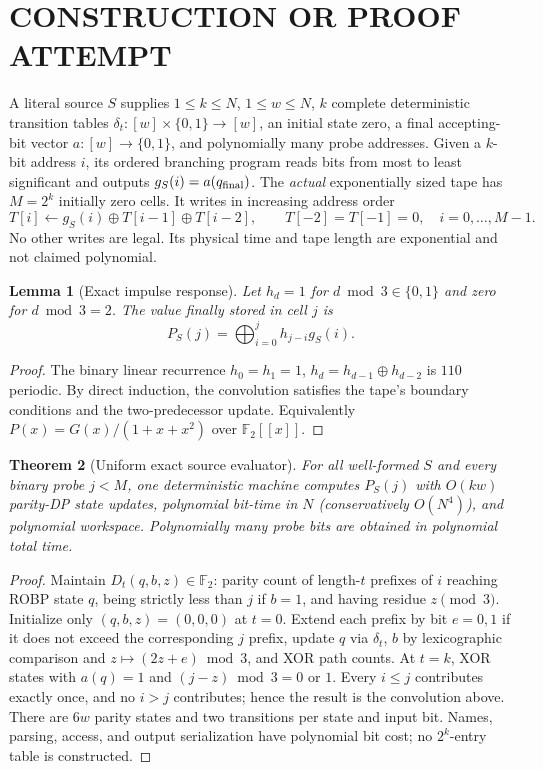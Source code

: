 \documentclass[11pt]{article}
\newtheorem{theorem}{Theorem}
\newtheorem{lemma}[theorem]{Lemma}
\begin{document}
\section{CONSTRUCTION OR PROOF ATTEMPT}
A literal source $S$ supplies $1\le k\le N$, $1\le w\le N$, $k$ complete deterministic transition tables $\delta_t:[w]\times\{0,1\}\to[w]$, an initial state zero, a final accepting-bit vector $a:[w]\to\{0,1\}$, and polynomially many probe addresses. Given a $k$-bit address $i$, its ordered branching program reads bits from most to least significant and outputs $g_S(i)=a(q_{\rm final})$. The \emph{actual} exponentially sized tape has $M=2^k$ initially zero cells. It writes in increasing address order
\[
T[i]\leftarrow g_S(i)\oplus T[i-1]\oplus T[i-2],
\qquad T[-2]=T[-1]=0,\quad i=0,\ldots,M-1.
\]
No other writes are legal. Its physical time and tape length are exponential and not claimed polynomial.
\begin{lemma}[Exact impulse response]
Let $h_d=1$ for $d\bmod3\in\{0,1\}$ and zero for $d\bmod3=2$. The value finally stored in cell $j$ is
\[
P_S(j)=\bigoplus_{i=0}^{j}h_{j-i}g_S(i).
\]
\end{lemma}
\begin{proof}
The binary linear recurrence $h_0=h_1=1$, $h_d=h_{d-1}\oplus h_{d-2}$ is $110$ periodic. By direct induction, the convolution satisfies the tape's boundary conditions and the two-predecessor update. Equivalently $P(x)=G(x)/(1+x+x^2)$ over $\mathbb F_2[[x]]$.
\end{proof}
\begin{theorem}[Uniform exact source evaluator]
For all well-formed $S$ and every binary probe $j<M$, one deterministic machine computes $P_S(j)$ with $O(kw)$ parity-DP state updates, polynomial bit-time in $N$ (conservatively $O(N^4)$), and polynomial workspace. Polynomially many probe bits are obtained in polynomial total time.
\end{theorem}
\begin{proof}
Maintain $D_t(q,b,z)\in\mathbb F_2$: parity count of length-$t$ prefixes of $i$ reaching ROBP state $q$, being strictly less than $j$ if $b=1$, and having residue $z\pmod3$. Initialize only $(q,b,z)=(0,0,0)$ at $t=0$. Extend each prefix by bit $e=0,1$ if it does not exceed the corresponding $j$ prefix, update $q$ via $\delta_t$, $b$ by lexicographic comparison and $z\mapsto(2z+e)\bmod3$, and XOR path counts. At $t=k$, XOR states with $a(q)=1$ and $(j-z)\bmod3=0$ or $1$. Every $i\le j$ contributes exactly once, and no $i>j$ contributes; hence the result is the convolution above. There are $6w$ parity states and two transitions per state and input bit. Names, parsing, access, and output serialization have polynomial bit cost; no $2^k$-entry table is constructed.
\end{proof}
\end{document}
